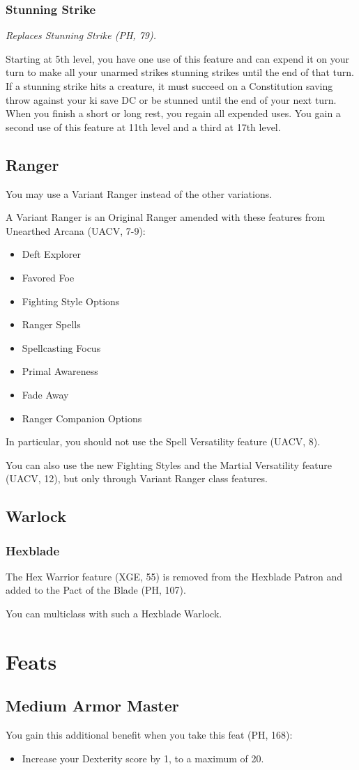 \documentclass[House_Rules.tex]{subfiles}
\begin{document}
\subsubsection{Stunning Strike}
\textit{Replaces Stunning Strike (PH, 79).}

Starting at 5th level, you have one use of this feature and can expend it on your turn to make all your unarmed strikes stunning strikes until the end of that turn. If a stunning strike hits a creature, it must succeed on a Constitution saving throw against your ki save DC or be stunned until the end of your next turn. When you finish a short or long rest, you regain all expended uses. You gain a second use of this feature at 11th level and a third at 17th level. 

\subsection{Ranger}
You may use a Variant Ranger instead of the other variations.

A Variant Ranger is an Original Ranger amended with these features from Unearthed Arcana (UACV, 7-9):

\begin{itemize}
    \item Deft Explorer
    \item Favored Foe
    \item Fighting Style Options
    \item Ranger Spells
    \item Spellcasting Focus
    \item Primal Awareness
    \item Fade Away
    \item Ranger Companion Options
\end{itemize}

In particular, you should not use the Spell Versatility feature (UACV, 8).

You can also use the new Fighting Styles and the Martial Versatility feature (UACV, 12), but only through Variant Ranger class features.

\subsection{Warlock}

\subsubsection{Hexblade}
The Hex Warrior feature (XGE, 55) is removed from the Hexblade Patron and added to the Pact of the Blade (PH, 107).

You can multiclass with such a Hexblade Warlock.




\section{Feats}
\subsection{Medium Armor Master}

You gain this additional benefit when you take this feat (PH, 168):

\begin{itemize}
\item Increase your Dexterity score by 1, to a maximum of 20.
\end{itemize}
\end{document}
